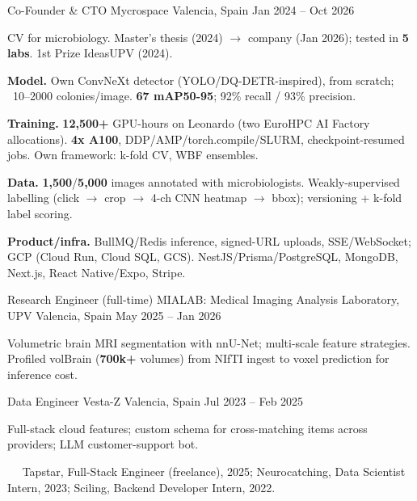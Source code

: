 \begin{cventries}
\cvkeep
\cventry
    {Co-Founder \& CTO}
    {Mycrospace}
    {Valencia, Spain}
    {Jan 2024 – Oct 2026}
    {
\begin{cvitems}
\item {CV for microbiology. Master's thesis (2024) $\rightarrow$ company (Jan 2026); tested in \textbf{5 labs}. 1st Prize IdeasUPV (2024).}
\item {\textbf{Model.} Own ConvNeXt detector (YOLO/DQ-DETR-inspired), from scratch; ~10–2000 colonies/image. \textbf{67 mAP50-95}; 92\% recall / 93\% precision.}
\item {\textbf{Training.} \textbf{12,500+} GPU-hours on Leonardo (two EuroHPC AI Factory allocations). \textbf{4x A100}, DDP/AMP/torch.compile/SLURM, checkpoint-resumed jobs. Own framework: k-fold CV, WBF ensembles.}
\item {\textbf{Data.} \textbf{1,500}/\textbf{5,000} images annotated with microbiologists. Weakly-supervised labelling (click $\rightarrow$ crop $\rightarrow$ 4-ch CNN heatmap $\rightarrow$ bbox); versioning + k-fold label scoring.}
\item {\textbf{Product/infra.} BullMQ/Redis inference, signed-URL uploads, SSE/WebSocket; GCP (Cloud Run, Cloud SQL, GCS). NestJS/Prisma/PostgreSQL, MongoDB, Next.js, React Native/Expo, Stripe.}
\end{cvitems}
    }
\cvkeep
\cventry
    {Research Engineer (full-time)}
    {MIALAB: Medical Imaging Analysis Laboratory, UPV}
    {Valencia, Spain}
    {May 2025 – Jan 2026}
    {
\begin{cvitems}
\item {Volumetric brain MRI segmentation with nnU-Net; multi-scale feature strategies. Profiled volBrain (\textbf{700k+} volumes) from NIfTI ingest to voxel prediction for inference cost.}
\end{cvitems}
    }
\cvkeep
\cventry
    {Data Engineer}
    {Vesta-Z}
    {Valencia, Spain}
    {Jul 2023 – Feb 2025}
    {
\begin{cvitems}
\item {Full-stack cloud features; custom schema for cross-matching items across providers; LLM customer-support bot.}
\end{cvitems}
    }
\end{cventries}
\vspace{0.4mm}
~~{\fontsize{8pt}{1em}\bodyfontlight\color{text} Tapstar, Full-Stack Engineer (freelance), 2025; Neurocatching, Data Scientist Intern, 2023; Sciling, Backend Developer Intern, 2022.}\par
